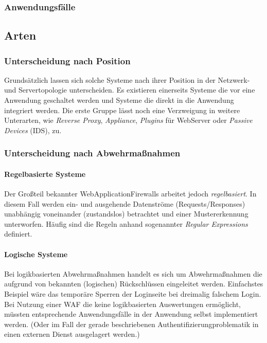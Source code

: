 
\subsubsection{Anwendungsfälle}

\subsection{Arten}

\subsubsection{Unterscheidung nach Position}
Grundsätzlich lassen sich solche Systeme nach ihrer Position in der Netzwerk- und Servertopologie unterscheiden. Es existieren einerseits Systeme die vor eine Anwendung geschaltet werden und Systeme die direkt in die Anwendung integriert werden. Die erste Gruppe lässt noch eine Verzweigung in weitere Unterarten, wie \emph{Reverse Proxy}, \emph{Appliance}, \emph{Plugins} für WebServer oder \emph{Passive Devices} (IDS), zu.


\subsubsection{Unterscheidung nach Abwehrmaßnahmen}

\paragraph{Regelbasierte Systeme}
Der Großteil bekannter WebApplicationFirewalls arbeitet jedoch \emph{regelbasiert}. In diesem Fall werden ein- und ausgehende Datenströme (Requests/Responses) unabhängig voneinander (zustandslos) betrachtet und einer Mustererkennung unterworfen. Häufig sind die Regeln anhand sogenannter \emph{Regular Expressions} definiert.

\paragraph{Logische Systeme}
Bei logikbasierten Abwehrmaßnahmen handelt es sich um Abwehrmaßnahmen die aufgrund von bekannten (logischen) Rückschlüssen eingeleitet werden. Einfachstes Beispiel wäre das temporäre Sperren der Loginseite bei dreimalig falschem Login. Bei Nutzung einer WAF die keine logikbasierten Auswertungen ermöglicht, müssten entsprechende Anwendungsfälle in der Anwendung selbst implementiert werden. (Oder im Fall der gerade beschriebenen Authentifizierungproblematik in einen externen Dienst ausgelagert werden.)

